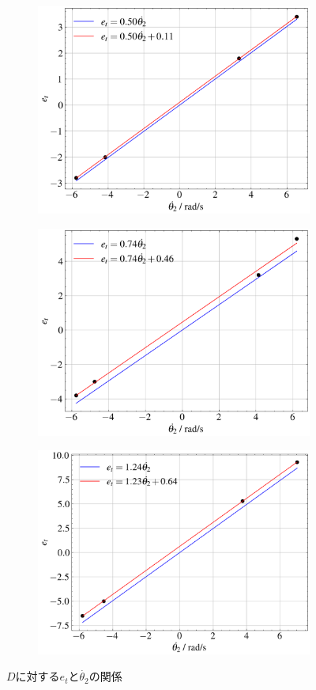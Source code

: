 \begin{figure}
	\centering
	\begin{subfigure}{0.48\columnwidth}
		\centering
		\includegraphics[width=0.8\linewidth]{src/figures/theta_dot-e_t-relation/theta_dot-e_t-relation-D60.png}
	\end{subfigure}
	\begin{subfigure}{0.48\columnwidth}
		\centering
		\includegraphics[width=0.8\linewidth]{src/figures/theta_dot-e_t-relation/theta_dot-e_t-relation-D80.png}
	\end{subfigure}
	\begin{subfigure}{0.48\columnwidth}
		\centering
		\includegraphics[width=0.8\linewidth]{src/figures/theta_dot-e_t-relation/theta_dot-e_t-relation-D100.png}
	\end{subfigure}
	\caption{$D$に対する$e_t$と$\dot{\theta_2}$の関係}\label{fig:theta_dot-e_t-relation}
\end{figure}
